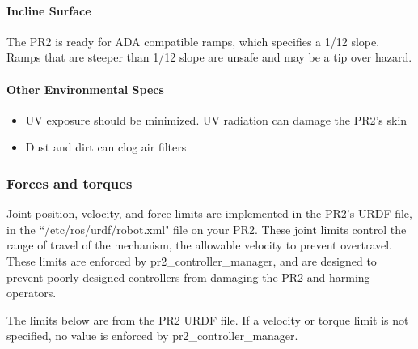 \paragraph{Incline Surface}

The PR2 is ready for ADA compatible ramps, which specifies a 1/12 slope. Ramps that are steeper than 1/12 slope are unsafe and may be a tip over hazard.

\paragraph{Other Environmental Specs}

\begin{itemize}
\item UV exposure should be minimized. UV radiation can damage the PR2's skin
\item Dust and dirt can clog air filters
\end{itemize}

\subsubsection{Forces and torques}

Joint position, velocity, and force limits are implemented in the PR2's URDF file, in the ``/etc/ros/urdf/robot.xml" file on your PR2. These joint limits control the range of travel of the mechanism, the allowable velocity to prevent overtravel. These limits are enforced by pr2\_controller\_manager, and are designed to prevent poorly designed controllers from damaging the PR2 and harming operators. 



The limits below are from the PR2 URDF file. If a velocity or torque limit is not specified, no value is enforced by pr2\_controller\_manager.

